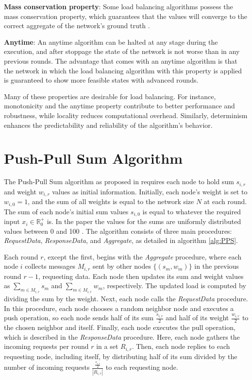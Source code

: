 \textbf{Mass conservation property}: Some load balancing algorithms possess the mass conservation property, which guarantees that the values will converge to the correct aggregate of the network's ground truth \cite{nugroho2023PushPullSumDataAg}.

\textbf{Anytime}: An anytime algorithm can be halted at any stage during the execution, and after stoppage the state of the network is not worse than in any previous rounds. The advantage that comes with an anytime algorithm is that the network in which the load balancing algorithm with this property is applied is guaranteed to show more feasible states with advanced rounds. \cite{Dinitz2023DAB}

Many of these properties are desirable for load balancing. For instance, monotonicity and the anytime property contribute to better performance and robustness, while locality reduces computational overhead. Similarly, determinism enhances the predictability and reliability of the algorithm's behavior.

\section{Push-Pull Sum Algorithm}\label{sec:classicPPS}
The Push-Pull Sum algorithm as proposed in \cite{nugroho2023PushPullSumDataAg} requires each node to hold sum $s_{i,r}$ and weight $w_{i,r}$ values as initial information. Initially, each node's weight is set to $w_{i,0} = 1$, and the sum of all weights is equal to the network size $N$ at each round. The sum of each node's initial sum values $s_{i,0}$ is equal to whatever the required input $x_i \in \mathbb{R}^{+}_{0}$ is. In the paper the values for the sums are uniformly distributed values between 0 and 100 \cite{nugroho2023PushPullSumDataAg}. The algorithm consists of three main procedures: \textit{RequestData}, \textit{ResponseData}, and \textit{Aggregate}, as detailed in algorithm \ref{alg:PPS}.

Each round $r$, except the first, begins with the \textit{Aggregate} procedure, where each node $i$ collects messages $M_{i,r}$ sent by other nodes $\{(s_m, w_m)\}$ in the previous round $r-1$, requesting data. Each node then updates its sum and weight values as $\sum_{m \in M_{i,r}}{s_m}$ and $\sum_{m \in M_{i,r}}{w_m}$, respectively. The updated load is computed by dividing the sum by the weight. Next, each node calls the \textit{RequestData} procedure. In this procedure, each node chooses a random neighbor node and executes a push operation, so each node sends half of its sum $\frac{s_{i,r}}{2}$ and half of its weight $\frac{w_{i,r}}{2}$ to the chosen neighbor and itself. Finally, each node executes the pull operation, which is described in the \textit{ResponseData} procedure. Here, each node gathers the incoming requests per round $r$ in a set $R_{i, r}$. Then, each node replies to each requesting node, including itself, by distributing half of its sum divided by the number of incoming requests $\frac{\frac{s_{i,r}}{2}}{|R_{i, r}|}$ to each requesting node.

